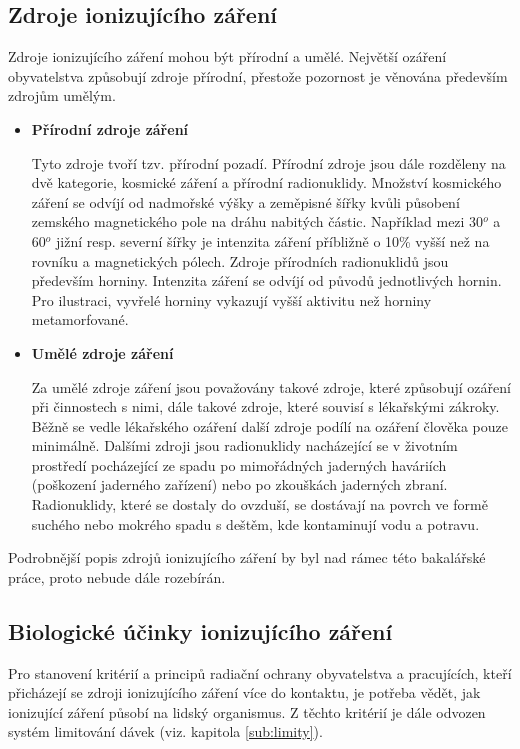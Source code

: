 \subsection{Zdroje ionizujícího záření} 
Zdroje ionizujícího záření mohou být přírodní a umělé. Největší ozáření obyvatelstva způsobují zdroje přírodní, přestože pozornost je věnována především zdrojům umělým. %

\begin{itemize}
	\item \textbf{Přírodní zdroje záření}
	
			Tyto zdroje tvoří tzv. přírodní pozadí. Přírodní zdroje jsou dále rozděleny na dvě kategorie, kosmické záření a přírodní radionuklidy. %
			Množství kosmického záření se odvíjí od nadmořské výšky a zeměpisné šířky kvůli působení zemského magnetického pole na dráhu nabitých částic. Například mezi 30$^{o}$ a 60$^{o}$ jižní resp. severní šířky je intenzita záření příbližně o 10\% vyšší než na rovníku a magnetických pólech. %
			Zdroje přírodních radionuklidů jsou především horniny. Intenzita záření  se odvíjí od původů jednotlivých hornin. Pro ilustraci, vyvřelé horniny vykazují vyšší aktivitu než horniny metamorfované. %
	
	\item \textbf{Umělé zdroje záření} %
	
			Za umělé zdroje záření jsou považovány takové zdroje, které způsobují ozáření při činnostech s nimi, dále takové zdroje, které souvisí s lékařskými zákroky. Běžně se vedle lékařského ozáření další zdroje podílí na ozáření člověka pouze minimálně. Dalšími zdroji jsou radionuklidy nacházející se v životním prostředí pocházející ze spadu po mimořádných jaderných haváriích (poškození jaderného zařízení) nebo po zkouškách jaderných zbraní. Radionuklidy, které se dostaly do ovzduší, se dostávají na povrch ve formě suchého nebo mokrého spadu s deštěm, kde kontaminují vodu a potravu. %
			
\end{itemize}

Podrobnější popis zdrojů ionizujícího záření by byl nad rámec této bakalářské práce, proto nebude dále rozebírán. 

\subsection{Biologické účinky ionizujícího záření}
Pro stanovení kritérií a principů radiační ochrany obyvatelstva a pracujících, kteří přicházejí se zdroji ionizujícího záření více do kontaktu, je potřeba vědět, jak ionizující záření působí na lidský organismus. Z těchto kritérií je dále odvozen systém limitování dávek (viz. kapitola \ref{sub:limity}). 

